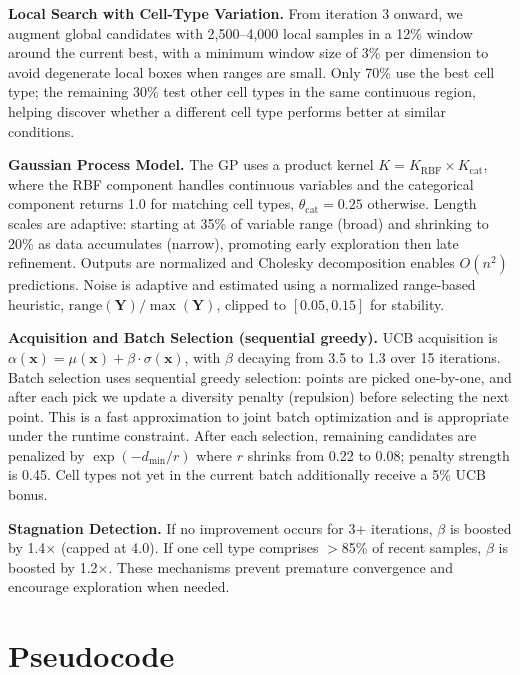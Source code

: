 \documentclass[11pt,a4paper]{article}
\begin{document}
\textbf{Local Search with Cell-Type Variation.}
From iteration 3 onward, we augment global candidates with 2,500--4,000 local samples in a 12\% window around the current best, with a minimum window size of 3\% per dimension to avoid degenerate local boxes when ranges are small.
Only 70\% use the best cell type; the remaining 30\% test other cell types in the same continuous region, helping discover whether a different cell type performs better at similar conditions.

\textbf{Gaussian Process Model.}
The GP uses a product kernel $K = K_{\text{RBF}} \times K_{\text{cat}}$, where the RBF component handles continuous variables and the categorical component returns 1.0 for matching cell types, $\theta_{\text{cat}}=0.25$ otherwise.
Length scales are adaptive: starting at 35\% of variable range (broad) and shrinking to 20\% as data accumulates (narrow), promoting early exploration then late refinement.
Outputs are normalized and Cholesky decomposition enables $O(n^2)$ predictions.
Noise is adaptive and estimated using a normalized range-based heuristic, $\text{range}(\mathbf{Y})/\max(\mathbf{Y})$, clipped to $[0.05,0.15]$ for stability.

\textbf{Acquisition and Batch Selection (sequential greedy).}
UCB acquisition is $\alpha(\mathbf{x}) = \mu(\mathbf{x}) + \beta \cdot \sigma(\mathbf{x})$, with $\beta$ decaying from 3.5 to 1.3 over 15 iterations.
Batch selection uses sequential greedy selection: points are picked one-by-one, and after each pick we update a diversity penalty (repulsion) before selecting the next point.
This is a fast approximation to joint batch optimization and is appropriate under the runtime constraint.
After each selection, remaining candidates are penalized by $\exp(-d_{\min}/r)$ where $r$ shrinks from 0.22 to 0.08; penalty strength is 0.45.
Cell types not yet in the current batch additionally receive a 5\% UCB bonus.

\textbf{Stagnation Detection.}
If no improvement occurs for 3+ iterations, $\beta$ is boosted by 1.4$\times$ (capped at 4.0).
If one cell type comprises $>$85\% of recent samples, $\beta$ is boosted by 1.2$\times$.
These mechanisms prevent premature convergence and encourage exploration when needed.

\section{Pseudocode}
\end{document}
